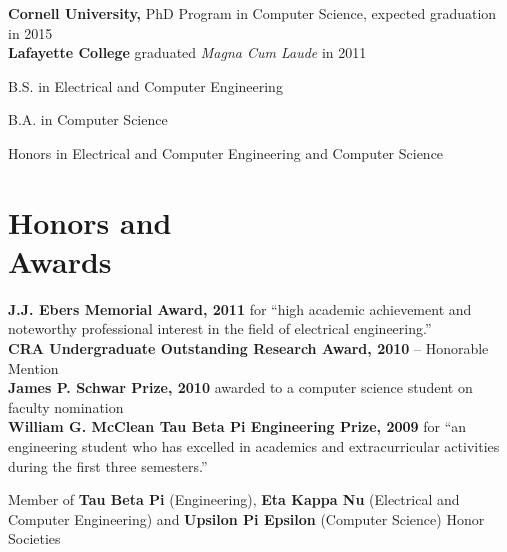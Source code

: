 \documentclass[margin,line]{resume}
\begin{document}
\begin{resume}
    {\bf Cornell University,} PhD Program in Computer Science, expected
    graduation in 2015\\
    {\bf Lafayette College} \vspace{2mm} graduated \emph{Magna Cum Laude} in 2011%
    \begin{list2}
        \item B.S. in Electrical and Computer Engineering
        \item B.A. in Computer Science
        \item Honors in Electrical and Computer Engineering and Computer Science
    \end{list2}
    \section{\mysidestyle Honors and\\Awards} 

    {\bf J.J. Ebers Memorial Award, 2011} for ``high academic achievement and noteworthy professional
    interest in the field of electrical engineering.''\\
    {\bf CRA Undergraduate Outstanding Research Award, 2010} -- Honorable Mention \\
    {\bf James P. Schwar Prize, 2010} awarded to a computer science student on faculty nomination \\
    {\bf William G. McClean Tau Beta Pi Engineering Prize, 2009} for ``an engineering student who has excelled in academics and extracurricular activities during the first three semesters.''
    
    Member of {\bf Tau Beta Pi} (Engineering), {\bf Eta Kappa Nu} (Electrical and Computer Engineering)
    and {\bf Upsilon Pi Epsilon} (Computer Science) Honor Societies
    
    

\end{resume}
\end{document}
